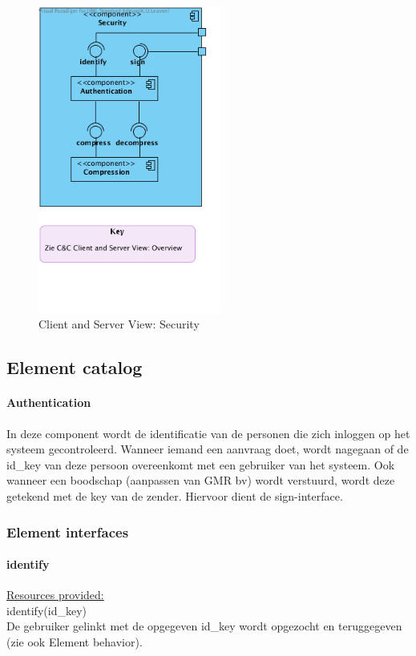 \documentclass[a4paper,10pt]{article}
\begin{document}
\begin{figure}[!h]
  \includegraphics[width=60mm]{../images/ClientServer_Security.png}
  \caption{Client and Server View: Security}
\end{figure}

\subsection{Element catalog}

\paragraph{Authentication}
In deze component wordt de identificatie van de personen die zich inloggen op het systeem gecontroleerd. Wanneer iemand een aanvraag doet, wordt nagegaan of de id\_key van deze persoon overeenkomt met een gebruiker van het systeem. Ook wanneer een boodschap (aanpassen van GMR bv) wordt verstuurd, wordt deze getekend met de key van de zender. Hiervoor dient de sign-interface.  

\subsubsection{Element interfaces}
\paragraph{identify}

\underline{Resources provided:}\\
identify(id\_key)\\
De gebruiker gelinkt met de opgegeven id\_key wordt opgezocht en teruggegeven (zie ook Element behavior).
\end{document}
